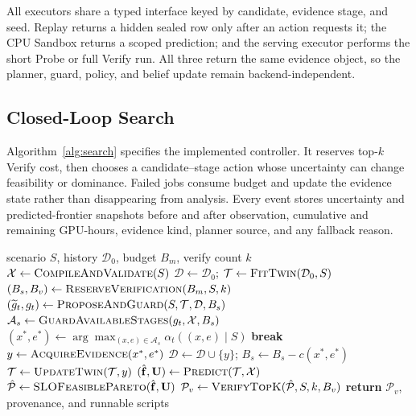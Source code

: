 All executors share a typed interface keyed by candidate, evidence stage, and
seed.  Replay returns a hidden sealed row only after an action requests it; the
CPU Sandbox returns a scoped prediction; and the serving executor performs the
short Probe or full Verify run.  All three return the same evidence object, so
the planner, guard, policy, and belief update remain backend-independent.

\subsection{Closed-Loop Search}

Algorithm~\ref{alg:search} specifies the implemented controller.  It reserves
top-$k$ Verify cost, then chooses a candidate--stage action whose uncertainty
can change feasibility or dominance.  Failed jobs consume budget and update the
evidence state rather than disappearing from analysis.  Every event stores
uncertainty and predicted-frontier snapshots before and after observation,
cumulative and remaining GPU-hours, evidence kind, planner source, and any
fallback reason.

\begin{algorithm}[t]
\caption{Evidence-gated single-GPU Pareto search}
\label{alg:search}
\footnotesize
\begin{algorithmic}[1]
\REQUIRE scenario $S$, history $\mathcal D_0$, budget $B_m$, verify count $k$
\STATE $\mathcal X\gets\textsc{CompileAndValidate}(S)$
\STATE $\mathcal D\gets\mathcal D_0$; $\mathcal T\gets\textsc{FitTwin}(\mathcal D_0,S)$
\STATE $(B_s,B_v)\gets\textsc{ReserveVerification}(B_m,S,k)$
  \STATE $(\widetilde g_t,g_t)\gets\textsc{ProposeAndGuard}(S,\mathcal T,\mathcal D,B_s)$
  \STATE $\mathcal A_s\gets\textsc{GuardAvailableStages}(g_t,\mathcal X,B_s)$
  \STATE $(x^*,e^*)\gets\arg\max_{(x,e)\in\mathcal A_s}
  \alpha_t((x,e)\mid S)$
    \STATE \textbf{break}
  \ENDIF
  \STATE $y\gets\textsc{AcquireEvidence}(x^*,e^*)$
  \STATE $\mathcal D\gets\mathcal D\cup\{y\}$; $B_s\gets B_s-c(x^*,e^*)$
  \STATE $\mathcal T\gets\textsc{UpdateTwin}(\mathcal T,y)$
\ENDWHILE
\STATE $(\hat{\mathbf f},\mathbf U)\gets\textsc{Predict}(\mathcal T,\mathcal X)$
\STATE $\hat{\mathcal P}\gets\textsc{SLOFeasiblePareto}(\hat{\mathbf f},\mathbf U)$
\STATE $\mathcal P_v\gets\textsc{VerifyTopK}(\hat{\mathcal P},S,k,B_v)$
\STATE \textbf{return} $\mathcal P_v$, provenance, and runnable scripts
\end{algorithmic}
\end{algorithm}

